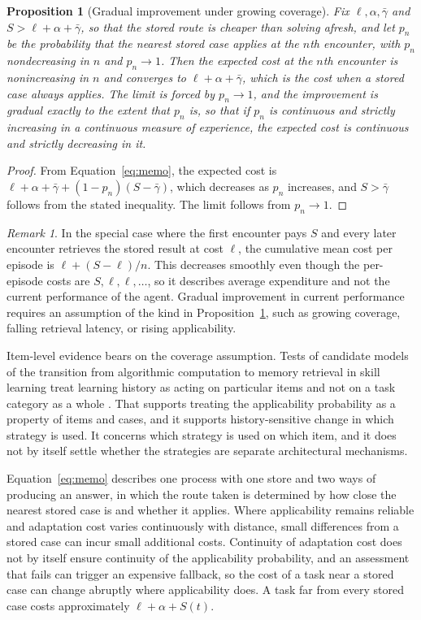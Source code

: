 \documentclass[11pt]{report}
\newtheorem{proposition}{Proposition}[chapter]
\theoremstyle{remark}
\newtheorem{remark}{Remark}[chapter]
\theoremstyle{definition}
\begin{document}
\begin{proposition}[Gradual improvement under growing coverage]\label{prop:improve}
Fix $\ell,\alpha,\bar\gamma$ and $S>\ell+\alpha+\bar\gamma$, so that the stored route is cheaper than solving afresh, and let $p_n$ be the probability that the nearest stored case applies at the $n$th encounter, with $p_n$ nondecreasing in $n$ and $p_n\to1$. Then the expected cost at the $n$th encounter is nonincreasing in $n$ and converges to $\ell+\alpha+\bar\gamma$, which is the cost when a stored case always applies. The limit is forced by $p_n\to1$, and the improvement is gradual exactly to the extent that $p_n$ is, so that if $p_n$ is continuous and strictly increasing in a continuous measure of experience, the expected cost is continuous and strictly decreasing in it.
\end{proposition}

\begin{proof}
From Equation~\eqref{eq:memo}, the expected cost is $\ell+\alpha+\bar\gamma+(1-p_n)(S-\bar\gamma)$, which decreases as $p_n$ increases, and $S>\bar\gamma$ follows from the stated inequality. The limit follows from $p_n\to1$.
\end{proof}

\begin{remark}
In the special case where the first encounter pays $S$ and every later encounter retrieves the stored result at cost $\ell$, the cumulative mean cost per episode is $\ell+(S-\ell)/n$. This decreases smoothly even though the per-episode costs are $S,\ell,\ell,\ldots$, so it describes average expenditure and not the current performance of the agent. Gradual improvement in current performance requires an assumption of the kind in Proposition~\ref{prop:improve}, such as growing coverage, falling retrieval latency, or rising applicability.
\end{remark}

Item-level evidence bears on the coverage assumption. Tests of candidate models of the transition from algorithmic computation to memory retrieval in skill learning treat learning history as acting on particular items and not on a task category as a whole \cite{rickard2004}. That supports treating the applicability probability as a property of items and cases, and it supports history-sensitive change in which strategy is used. It concerns which strategy is used on which item, and it does not by itself settle whether the strategies are separate architectural mechanisms.

Equation~\eqref{eq:memo} describes one process with one store and two ways of producing an answer, in which the route taken is determined by how close the nearest stored case is and whether it applies. Where applicability remains reliable and adaptation cost varies continuously with distance, small differences from a stored case can incur small additional costs. Continuity of adaptation cost does not by itself ensure continuity of the applicability probability, and an assessment that fails can trigger an expensive fallback, so the cost of a task near a stored case can change abruptly where applicability does. A task far from every stored case costs approximately $\ell+\alpha+S(t)$.
\end{document}

